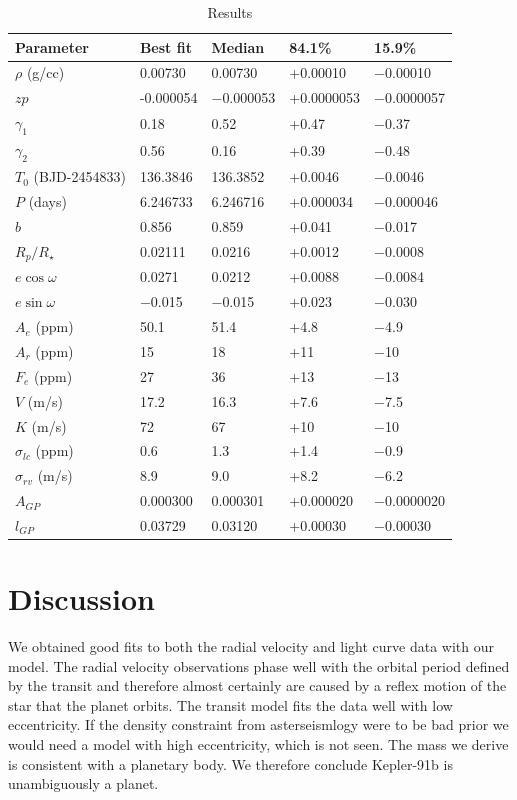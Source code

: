 \documentclass[apjl]{emulateapj}
\begin{document}
\begin{table}
\caption{Results}\label{tab:results}
\begin{tabular}{l l l l l}
Parameter&Best fit& Median&84.1\%&15.9\%\\
\hline
$\rho$ (g/cc)		&0.00730	& 0.00730&{+0.00010}&$-$0.00010\\
$zp$			&-0.000054	& $-$0.000053&{+0.0000053}&$-$0.0000057\\
$\gamma_1$	&0.18	& 0.52&{+0.47}&$-$0.37\\
$\gamma_2$	&0.56	& 0.16&{+0.39}&$-$0.48\\
$T_0$ (BJD-2454833)		&	136.3846& 136.3852&{+0.0046}&$-$0.0046 \\
$P$ 	(days)		&6.246733& 6.246716&{+0.000034}&$-$0.000046\\
$b$ 			&	0.856& 0.859&{+0.041}&$-$0.017\\
$R_{p}/R_{\star}$& 	0.02111& 0.0216&{+0.0012}&$-$0.0008 \\
$e\cos{\omega}$ &	0.0271& 0.0212&{+0.0088}&$-$0.0084\\
$e\sin{\omega}$ &	$-$0.015& $-$0.015&{+0.023}&$-$0.030\\
$A_e$ (ppm)		&	50.1& 51.4&{+4.8}&$-$4.9\\
$A_r$ (ppm)		&	15& 18&{+11}&$-$10\\
$F_e$ (ppm)		&	27& 36&{+13}&$-$13\\
$V$ 	(m/s)		&	17.2& 16.3&{+7.6}&$-$7.5\\
$K$ 	(m/s)		&72	& 67&{+10}&$-$10 \\
$\sigma_{lc}$ (ppm)	&0.6	& 1.3&{+1.4}&$-$0.9  \\
$\sigma_{rv}$ (m/s)	&	8.9& 9.0&{+8.2}&$-$6.2\\
$A_{GP}$ &0.000300& 0.000301 & {+0.000020}&$-$0.0000020 \\ 
$l_{GP}$  &0.03729& 0.03120&{+0.00030}&$-$0.00030 \\
\hline
\end{tabular}
\end{table}


\section{Discussion}
We obtained good fits to both the radial velocity and light curve data with our model. The radial velocity observations phase well with the orbital period defined by the transit and therefore almost certainly are caused by a reflex motion of the star that the planet orbits. The transit model fits the data well with low eccentricity. If the density constraint from asterseismlogy were to be bad prior we would need a model with high eccentricity, which is not seen. The mass we derive is consistent with a planetary body. We therefore conclude Kepler-91b is unambiguously a planet.
\end{document}
